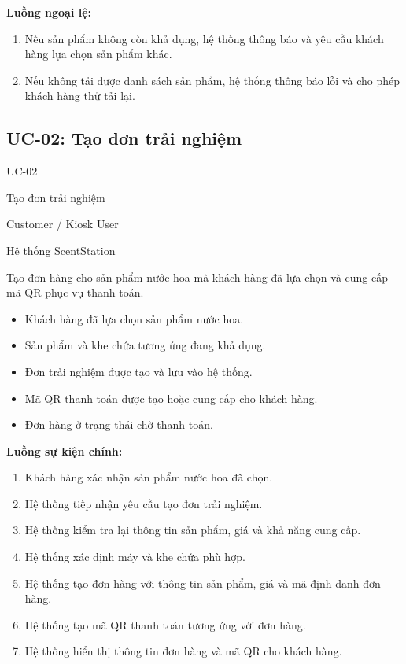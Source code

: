 \textbf{Luồng ngoại lệ:}
\begin{enumerate}[label=\arabic{enumi}a*.]
    \item Nếu sản phẩm không còn khả dụng, hệ thống thông báo và yêu cầu khách hàng lựa chọn sản phẩm khác.
    \item Nếu không tải được danh sách sản phẩm, hệ thống thông báo lỗi và cho phép khách hàng thử tải lại.
\end{enumerate}

\subsection{UC-02: Tạo đơn trải nghiệm}

\begin{description}[leftmargin=3.5cm,style=nextline]
    \item[Mã Use Case:] UC-02
    \item[Tên Use Case:] Tạo đơn trải nghiệm
    \item[Tác nhân chính:] Customer / Kiosk User
    \item[Tác nhân liên quan:] Hệ thống ScentStation
    \item[Mục tiêu:] Tạo đơn hàng cho sản phẩm nước hoa mà khách hàng đã lựa chọn và cung cấp mã QR phục vụ thanh toán.
    \item[Tiền điều kiện:]
    \begin{itemize}
        \item Khách hàng đã lựa chọn sản phẩm nước hoa.
        \item Sản phẩm và khe chứa tương ứng đang khả dụng.
    \end{itemize}
    \item[Hậu điều kiện:]
    \begin{itemize}
        \item Đơn trải nghiệm được tạo và lưu vào hệ thống.
        \item Mã QR thanh toán được tạo hoặc cung cấp cho khách hàng.
        \item Đơn hàng ở trạng thái chờ thanh toán.
    \end{itemize}
\end{description}

\textbf{Luồng sự kiện chính:}
\begin{enumerate}
    \item Khách hàng xác nhận sản phẩm nước hoa đã chọn.
    \item Hệ thống tiếp nhận yêu cầu tạo đơn trải nghiệm.
    \item Hệ thống kiểm tra lại thông tin sản phẩm, giá và khả năng cung cấp.
    \item Hệ thống xác định máy và khe chứa phù hợp.
    \item Hệ thống tạo đơn hàng với thông tin sản phẩm, giá và mã định danh đơn hàng.
    \item Hệ thống tạo mã QR thanh toán tương ứng với đơn hàng.
    \item Hệ thống hiển thị thông tin đơn hàng và mã QR cho khách hàng.
\end{enumerate}

